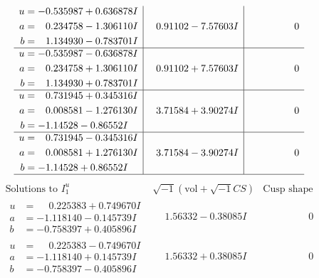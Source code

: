 \documentclass[1p]{elsarticle_modified}
\theoremstyle{definition}
\newcommand{\I}{\sqrt{-1}}
\begin{document}
$$\begin{array}{c|c|c}
\begin{aligned}
u &= -0.535987 + 0.636878 I \\
a &= \phantom{-}0.234758 - 1.306110 I \\
b &= \phantom{-}1.134930 - 0.783701 I\end{aligned}
 & \phantom{-}0.91102 - 7.57603 I & \phantom{-0.000000 } 0 \\ \hline\begin{aligned}
u &= -0.535987 - 0.636878 I \\
a &= \phantom{-}0.234758 + 1.306110 I \\
b &= \phantom{-}1.134930 + 0.783701 I\end{aligned}
 & \phantom{-}0.91102 + 7.57603 I & \phantom{-0.000000 } 0 \\ \hline\begin{aligned}
u &= \phantom{-}0.731945 + 0.345316 I \\
a &= \phantom{-}0.008581 - 1.276130 I \\
b &= -1.14528 - 0.86552 I\end{aligned}
 & \phantom{-}3.71584 + 3.90274 I & \phantom{-0.000000 } 0 \\ \hline\begin{aligned}
u &= \phantom{-}0.731945 - 0.345316 I \\
a &= \phantom{-}0.008581 + 1.276130 I \\
b &= -1.14528 + 0.86552 I\end{aligned}
 & \phantom{-}3.71584 - 3.90274 I & \phantom{-0.000000 } 0\\
 \hline 
 \end{array}$$\newpage$$\begin{array}{c|c|c}  
\text{Solutions to }I^u_{1}& \I (\text{vol} + \sqrt{-1}CS) & \text{Cusp shape}\\
 \hline 
\begin{aligned}
u &= \phantom{-}0.225383 + 0.749670 I \\
a &= -1.118140 - 0.145739 I \\
b &= -0.758397 + 0.405896 I\end{aligned}
 & \phantom{-}1.56332 - 0.38085 I & \phantom{-0.000000 } 0 \\ \hline\begin{aligned}
u &= \phantom{-}0.225383 - 0.749670 I \\
a &= -1.118140 + 0.145739 I \\
b &= -0.758397 - 0.405896 I\end{aligned}
 & \phantom{-}1.56332 + 0.38085 I & \phantom{-0.000000 } 0 \\ \hline\begin{aligned}

\end{aligned}
\end{array}$$
\end{document}
